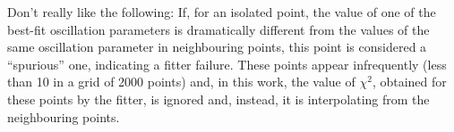 {\color{red} Don't really like the following:}
If, for an isolated point, the value of one of the best-fit oscillation parameters is dramatically different from the values of the same oscillation parameter in neighbouring points,
this point is considered a ``spurious'' one,  indicating a fitter failure. These points appear infrequently (less than 10 in a grid of 2000 points) and, in this work,
the value of $\chi^{2}$, obtained for these points by the fitter, is ignored and,  instead, it is interpolating from the neighbouring points.



 


